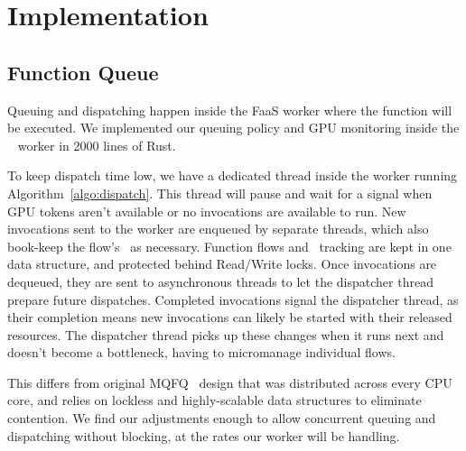 \section{Implementation}
\label{sec:impl}


\subsection{Function Queue}
\label{sec:q-impl}

Queuing and dispatching happen inside the FaaS worker where the function will be executed.
We implemented our queuing policy and GPU monitoring inside the \sysname~\cite{fuerst2023iluvatar} worker in 2000 lines of Rust.

To keep dispatch time low, we have a dedicated thread inside the worker running Algorithm~\ref{algo:dispatch}.
This thread will pause and wait for a signal when GPU tokens aren't available or no invocations are available to run.
New invocations sent to the worker are enqueued by separate threads, which also book-keep the flow's \VT~as necessary.
Function flows and \VT~tracking are kept in one data structure, and protected behind Read/Write locks.
Once invocations are dequeued, they are sent to asynchronous threads to let the dispatcher thread prepare future dispatches.
Completed invocations signal the dispatcher thread, as their completion means new invocations can likely be started with their released resources.
The dispatcher thread picks up these changes when it runs next and doesn't become a bottleneck, having to micromanage individual flows.

This differs from original MQFQ~\cite{hedayati2019multi} design that was distributed across every CPU core, and relies on lockless and highly-scalable data structures to eliminate contention.
We find our adjustments enough to allow concurrent queuing and dispatching without blocking, at the rates our worker will be handling.



